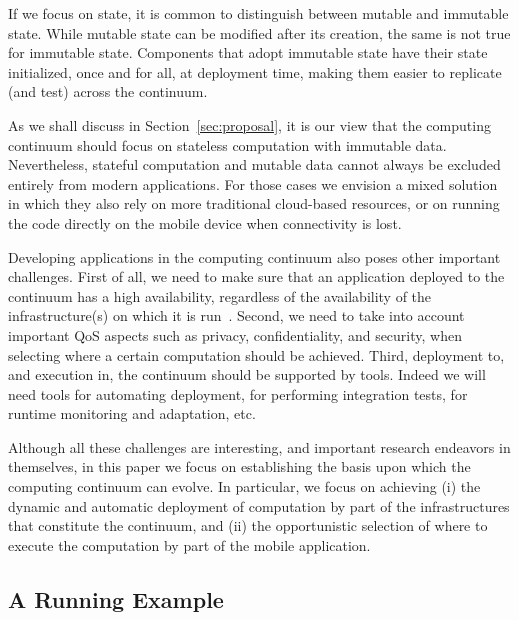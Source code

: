 If we focus on state, it is common to distinguish between mutable and immutable state. While mutable state can be modified after its creation, the same is not true for immutable state. Components that adopt immutable state have their state initialized, once and for all, at deployment time, making them easier to replicate (and test) across the continuum.

As we shall discuss in Section~\ref{sec:proposal}, it is our view that the computing continuum should focus on stateless computation with immutable data. Nevertheless, stateful computation and mutable data cannot always be excluded entirely from modern applications. For those cases we envision a mixed solution in which they also rely on more traditional cloud-based resources, or on running the code directly on the mobile device when connectivity is lost.

Developing applications in the computing continuum also poses other important challenges. First of all, we need to make sure that an application deployed to the continuum has a high availability, regardless of the availability of the infrastructure(s) on which it is run~\cite{garcia2017bandwidth}. Second, we need to take into account important QoS aspects such as privacy, confidentiality, and security, when selecting where a certain computation should be achieved. Third, deployment to, and execution in, the continuum should be supported by tools. Indeed we will need tools for automating deployment, for performing integration tests, for runtime monitoring and adaptation, etc. 

Although all these challenges are interesting, and important research endeavors in themselves, in this paper we focus on establishing the basis upon which the computing continuum can evolve. In particular, we focus on achieving (i) the dynamic and automatic deployment of computation by part of the infrastructures that constitute the continuum, and (ii) the opportunistic selection of where to execute the computation by part of the mobile application.

\subsection{A Running Example}
\label{sub:example}

